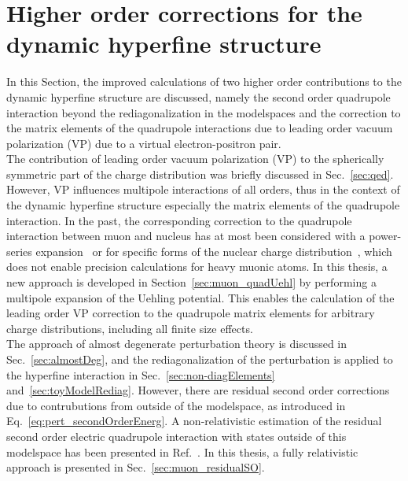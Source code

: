 \section{Higher order corrections for the dynamic hyperfine structure}
\label{sec:higherorder}
In this Section, the improved calculations of two higher order contributions to the dynamic hyperfine structure are discussed, namely the second order quadrupole interaction beyond the rediagonalization in the modelspaces and the correction to the matrix elements of the quadrupole interactions due to leading order vacuum polarization (VP) due to a virtual electron-positron pair.\\
The contribution of leading order vacuum polarization (VP) to the spherically symmetric part of the charge distribution was briefly discussed in Sec.~\ref{sec:qed}. However, VP influences multipole interactions of all orders, thus in the context of the dynamic hyperfine structure especially the matrix elements of the quadrupole interaction. In the past, the corresponding correction to the quadrupole interaction between muon and nucleus has at most been considered with a power-series expansion~\cite{Fricke1969vp,zehnder1975} or for specific forms of the nuclear charge distribution~\cite{pearson1963}, which does not enable precision calculations for heavy muonic atoms. In this thesis, a new approach is developed in Section~\ref{sec:muon_quadUehl} by performing a multipole expansion of the Uehling potential. This enables the calculation of the leading order VP correction to the quadrupole matrix elements for arbitrary charge distributions, including all finite size effects.\\
The approach of almost degenerate perturbation theory is discussed in Sec.~\ref{sec:almostDeg}, and the rediagonalization of the perturbation is applied to the hyperfine interaction in Sec.~\ref{sec:non-diagElements} and~\ref{sec:toyModelRediag}. However, there are residual second order corrections due to contrubutions from outside of the modelspace, as introduced in Eq.~\eqref{eq:pert_secondOrderEnerg}. A non-relativistic estimation of the residual second order electric quadrupole interaction with states outside of this modelspace has been presented in Ref.~\cite{chen1970}. In this thesis, a fully relativistic approach is presented in Sec.~\ref{sec:muon_residualSO}.

